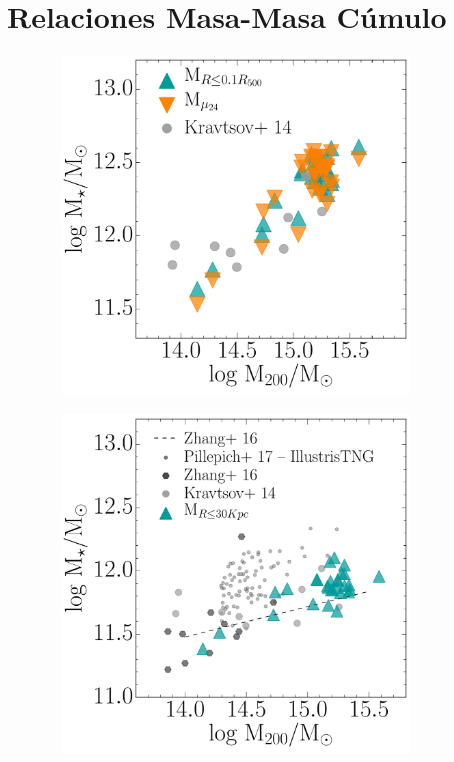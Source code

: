 \section{Relaciones Masa-Masa C\'umulo}

\begin{figure}[H]
 \centering
 \includegraphics[height=9cm, width=10cm]{../al_final/LR/evolucion/relaciones/mtotales.pdf}
\end{figure}

\begin{figure}[H]
 \centering
 \includegraphics[height=9cm, width=10cm]{../al_final/LR/evolucion/relaciones/M302D_vs_M200.pdf}
\end{figure}

